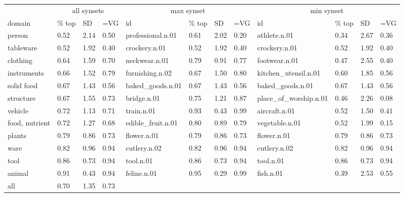 \documentclass[11pt,a4paper]{article}
\begin{document}
\begin{table}
\small
\begin{tabular}{llll|llll|llll}
\toprule
    & \multicolumn{3}{c|}{all synsets} & \multicolumn{4}{c|}{max synset} & \multicolumn{4}{c}{min synset} \\
                         domain & \% top &    SD &   =VG &         id &     \% top &    SD &   =VG &             id &     \% top &    SD &   =VG \\
\midrule
                           person &  0.52 &  2.14 &  0.50 &  professional.n.01 &  0.61 &  2.02 &  0.20 &           athlete.n.01 &  0.34 &  2.67 &  0.36 \\
                        tableware &  0.52 &  1.92 &  0.40 &      crockery.n.01 &  0.52 &  1.92 &  0.40 &          crockery.n.01 &  0.52 &  1.92 &  0.40 \\
              clothing &  0.64 &  1.59 &  0.70 &      neckwear.n.01 &  0.79 &  0.91 &  0.77 &          footwear.n.01 &  0.47 &  2.55 &  0.40 \\
 instruments &  0.66 &  1.52 &  0.79 &    furnishing.n.02 &  0.67 &  1.50 &  0.80 &   kitchen\_utensil.n.01 &  0.60 &  1.85 &  0.56 \\
                solid food &  0.67 &  1.43 &  0.56 &   baked\_goods.n.01 &  0.67 &  1.43 &  0.56 &       baked\_goods.n.01 &  0.67 &  1.43 &  0.56 \\
          structure &  0.67 &  1.55 &  0.73 &        bridge.n.01 &  0.75 &  1.21 &  0.87 &  place\_of\_worship.n.01 &  0.46 &  2.26 &  0.08 \\
                          vehicle &  0.72 &  1.13 &  0.71 &         train.n.01 &  0.93 &  0.43 &  0.99 &          aircraft.n.01 &  0.52 &  1.50 &  0.41 \\
                   food, nutrient &  0.72 &  1.27 &  0.68 &  edible\_fruit.n.01 &  0.80 &  0.89 &  0.79 &         vegetable.n.01 &  0.52 &  1.99 &  0.15 \\
         plants &  0.79 &  0.86 &  0.73 &        flower.n.01 &  0.79 &  0.86 &  0.73 &            flower.n.01 &  0.79 &  0.86 &  0.73 \\
                             ware &  0.82 &  0.96 &  0.94 &       cutlery.n.02 &  0.82 &  0.96 &  0.94 &           cutlery.n.02 &  0.82 &  0.96 &  0.94 \\
                             tool &  0.86 &  0.73 &  0.94 &          tool.n.01 &  0.86 &  0.73 &  0.94 &              tool.n.01 &  0.86 &  0.73 &  0.94 \\
                           animal &  0.91 &  0.43 &  0.94 &        feline.n.01 &  0.95 &  0.29 &  0.99 &              fish.n.01 &  0.39 &  2.53 &  0.55 \\
\bottomrule
 all &  0.70 &  1.35 &  0.73            \\


\end{tabular}
\end{table}
\end{document}
